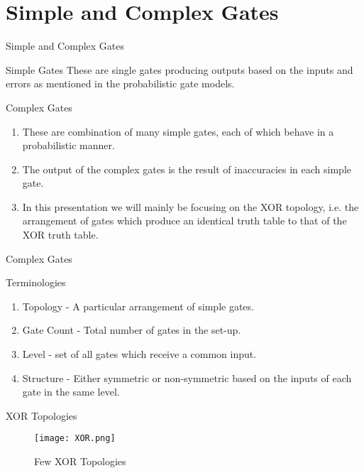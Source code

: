 \documentclass{beamer}
\begin{document}
\section{Simple and Complex Gates}
\begin{frame}{Simple and Complex Gates}
    \begin{block}{Simple Gates}
    These are single gates producing outputs based on the inputs and errors as mentioned in the probabilistic gate models.
    \end{block}
    \begin{block}{Complex Gates}
    \begin{enumerate}
        \item These are combination of many simple gates, each of which behave in a probabilistic manner.
        \item The output of the complex gates is the result of inaccuracies in each simple gate.
        \item In this presentation we will mainly be focusing on the XOR topology, i.e. the arrangement of gates which produce an identical truth table to that of the XOR truth table.
    \end{enumerate}
    \end{block}
\end{frame}

\begin{frame}{Complex Gates}
    \begin{block}{Terminologies}
    \begin{enumerate}
        \item Topology - A particular arrangement of simple gates.
        \item Gate Count - Total number of gates in the set-up.
        \item Level - set of all gates which receive a common input.
        \item Structure - Either symmetric or non-symmetric based on the inputs of each gate in the same level. 
    \end{enumerate}
    \end{block}
\end{frame}

\begin{frame}{XOR Topologies}
\begin{figure}
    \centering
    \texttt{[image: XOR.png]}
    \caption{Few XOR Topologies}
    \label{fig:my_label}
\end{figure}
\end{frame}
\end{document}
